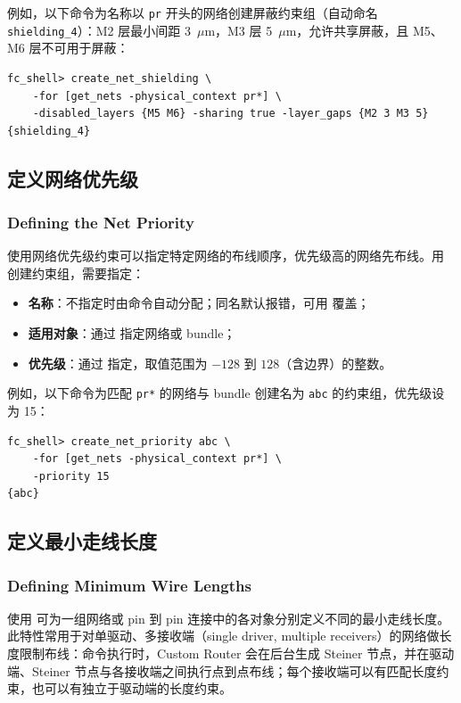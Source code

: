 例如，以下命令为名称以 \texttt{pr} 开头的网络创建屏蔽约束组（自动命名 \texttt{shielding\_4}）：M2 层最小间距 3~$\mu$m，M3 层 5~$\mu$m，允许共享屏蔽，且 M5、M6 层不可用于屏蔽：

\begin{lstlisting}
fc_shell> create_net_shielding \
    -for [get_nets -physical_context pr*] \
    -disabled_layers {M5 M6} -sharing true -layer_gaps {M2 3 M3 5}
{shielding_4}
\end{lstlisting}

\subsection{定义网络优先级}
\subsubsection*{Defining the Net Priority}

使用网络优先级约束可以指定特定网络的布线顺序，优先级高的网络先布线。用  创建约束组，需要指定：
\begin{itemize}
  \item \textbf{名称}：不指定时由命令自动分配；同名默认报错，可用 \opt{-force} 覆盖；
  \item \textbf{适用对象}：通过  指定网络或 bundle；
  \item \textbf{优先级}：通过 \opt{-priority} 指定，取值范围为 $-128$ 到 $128$（含边界）的整数。
\end{itemize}

例如，以下命令为匹配 \texttt{pr*} 的网络与 bundle 创建名为 \texttt{abc} 的约束组，优先级设为 15：

\begin{lstlisting}
fc_shell> create_net_priority abc \
    -for [get_nets -physical_context pr*] \
    -priority 15
{abc}
\end{lstlisting}

\subsection{定义最小走线长度}
\subsubsection*{Defining Minimum Wire Lengths}

使用  可为一组网络或 pin 到 pin 连接中的各对象分别定义不同的最小走线长度。此特性常用于对单驱动、多接收端（single driver, multiple receivers）的网络做长度限制布线：命令执行时，Custom Router 会在后台生成 Steiner 节点，并在驱动端、Steiner 节点与各接收端之间执行点到点布线；每个接收端可以有匹配长度约束，也可以有独立于驱动端的长度约束。

